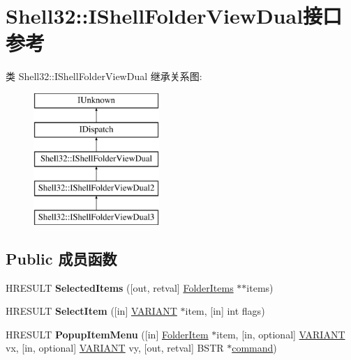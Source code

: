 \hypertarget{interface_shell32_1_1_i_shell_folder_view_dual}{}\section{Shell32\+:\+:I\+Shell\+Folder\+View\+Dual接口 参考}
\label{interface_shell32_1_1_i_shell_folder_view_dual}
类 Shell32\+:\+:I\+Shell\+Folder\+View\+Dual 继承关系图\+:\begin{figure}[H]
\begin{center}
\leavevmode
\includegraphics[height=5.000000cm]{interface_shell32_1_1_i_shell_folder_view_dual}
\end{center}
\end{figure}
\subsection*{Public 成员函数}
\begin{DoxyCompactItemize}
\item 
\mbox{\label{interface_shell32_1_1_i_shell_folder_view_dual_a2da1b460e65ef46cd30c5fe4c68cbba9}} 
H\+R\+E\+S\+U\+LT {\bfseries Selected\+Items} (\mbox{[}out, retval\mbox{]} \hyperlink{interface_shell32_1_1_folder_items}{Folder\+Items} $\ast$$\ast$items)
\item 
\mbox{\label{interface_shell32_1_1_i_shell_folder_view_dual_abf7edea20f12cd98deac9684e7352b34}} 
H\+R\+E\+S\+U\+LT {\bfseries Select\+Item} (\mbox{[}in\mbox{]} \hyperlink{structtag_v_a_r_i_a_n_t}{V\+A\+R\+I\+A\+NT} $\ast$item, \mbox{[}in\mbox{]} int flags)
\item 
\mbox{\label{interface_shell32_1_1_i_shell_folder_view_dual_ae26d2cfd3fc9eaacb8302f797b2eb82b}} 
H\+R\+E\+S\+U\+LT {\bfseries Popup\+Item\+Menu} (\mbox{[}in\mbox{]} \hyperlink{interface_shell32_1_1_folder_item}{Folder\+Item} $\ast$item, \mbox{[}in, optional\mbox{]} \hyperlink{structtag_v_a_r_i_a_n_t}{V\+A\+R\+I\+A\+NT} vx, \mbox{[}in, optional\mbox{]} \hyperlink{structtag_v_a_r_i_a_n_t}{V\+A\+R\+I\+A\+NT} vy, \mbox{[}out, retval\mbox{]} B\+S\+TR $\ast$\hyperlink{structcommand}{command})
\end{DoxyCompactItemize}
